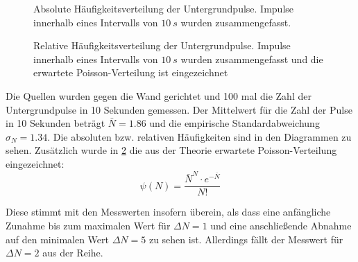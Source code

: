 \begin{figure}[H]
\centering
{}
\caption{Absolute Häufigkeitsverteilung der Untergrundpulse. Impulse innerhalb eines Intervalls von $\SI{10}{s}$ wurden zusammengefasst.}
\label{fig:untergrundabsolut}
\end{figure}
\begin{figure}[H]
\centering
{}
\caption{Relative Häufigkeitsverteilung der Untergrundpulse. Impulse innerhalb eines Intervalls von $\SI{10}{s}$ wurden zusammengefasst und die erwartete Poisson-Verteilung ist eingezeichnet}
\label{fig:untergrundrelativ}
\end{figure}

Die Quellen wurden gegen die Wand gerichtet und 100 mal die Zahl der Untergrundpulse in 10 Sekunden gemessen. Der Mittelwert für die Zahl der Pulse in 10 Sekunden beträgt $\bar{N}=\num{1.86}$ und die empirische Standardabweichung $\sigma_N=\num{1.34}$. Die absoluten bzw. relativen Häufigkeiten sind in den Diagrammen zu sehen. Zusätzlich wurde in \cref{fig:untergrundrelativ} die aus der Theorie erwartete Poisson-Verteilung eingezeichnet:
\begin{equation}
		\psi(N)=\frac{\bar{N}^N\cdot e^{-\bar{N}}}{N!}
		\label{eq:poisson}
	\end{equation}
	
	Diese stimmt mit den Messwerten insofern überein, als dass eine anfängliche Zunahme bis zum maximalen Wert für $\Delta N=1$ und eine anschließende Abnahme auf den minimalen Wert $\Delta N=5$  zu sehen ist. Allerdings fällt der Messwert für $\Delta N=2$ aus der Reihe.